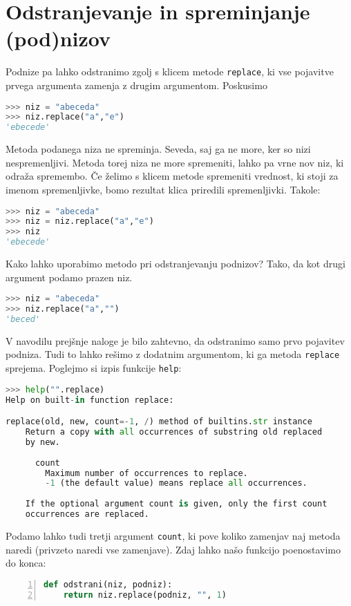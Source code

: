 \section{Odstranjevanje in spreminjanje (pod)nizov}
Podnize pa lahko odstranimo zgolj s klicem metode \texttt{replace}, ki vse pojavitve prvega argumenta zamenja z drugim argumentom. Poskusimo
\begin{lstlisting}[language=Python]
>>> niz = "abeceda"
>>> niz.replace("a","e")
'ebecede'
\end{lstlisting}
Metoda podanega niza ne spreminja. Seveda, saj ga ne more, ker so nizi nespremenljivi. Metoda torej niza ne more spremeniti, lahko pa vrne nov niz, ki odraža spremembo. Če želimo s klicem metode spremeniti vrednost, ki stoji za imenom spremenljivke, bomo rezultat klica priredili spremenljivki. Takole:
\begin{lstlisting}[language=Python]
>>> niz = "abeceda"
>>> niz = niz.replace("a","e")
>>> niz
'ebecede'
\end{lstlisting}
Kako lahko uporabimo metodo pri odstranjevanju podnizov? Tako, da kot drugi argument podamo prazen niz.
\begin{lstlisting}[language=Python]
>>> niz = "abeceda"
>>> niz.replace("a","")
'beced'
\end{lstlisting}
V navodilu prejšnje naloge je bilo zahtevno, da odstranimo samo prvo pojavitev podniza. Tudi to lahko rešimo z dodatnim argumentom, ki ga metoda \texttt{replace} sprejema. Poglejmo si izpis funkcije \texttt{help}:
\begin{lstlisting}[language=Python]
>>> help("".replace)
Help on built-in function replace:

replace(old, new, count=-1, /) method of builtins.str instance
    Return a copy with all occurrences of substring old replaced
    by new.
    
      count
        Maximum number of occurrences to replace.
        -1 (the default value) means replace all occurrences.
    
    If the optional argument count is given, only the first count 
    occurrences are replaced.
\end{lstlisting}
Podamo lahko tudi tretji argument \texttt{count}, ki pove koliko zamenjav naj metoda naredi (privzeto naredi vse zamenjave). Zdaj lahko našo funkcijo poenostavimo do konca:
\begin{lstlisting}[language=Python,numbers=left]
def odstrani(niz, podniz):
    return niz.replace(podniz, "", 1)
\end{lstlisting}

